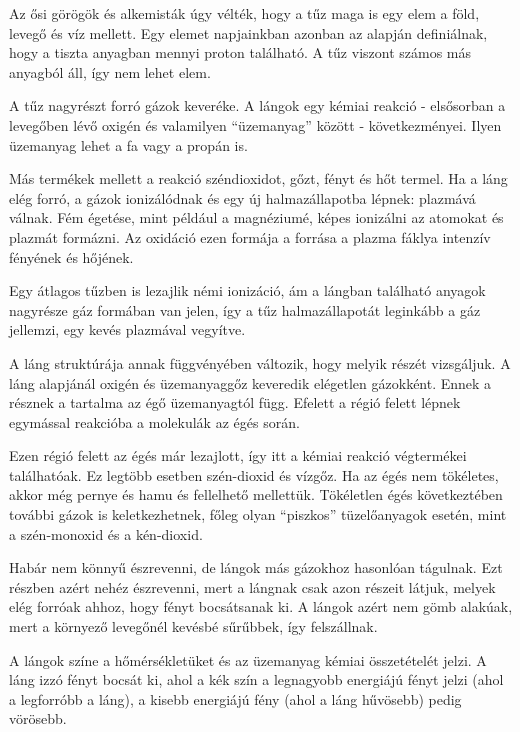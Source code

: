 
Az ősi görögök és alkemisták úgy vélték, hogy a tűz maga is egy elem a föld, levegő és víz mellett. Egy elemet napjainkban azonban az alapján definiálnak, hogy a tiszta anyagban mennyi proton található. A tűz viszont számos más anyagból áll, így nem lehet elem. 

A tűz nagyrészt forró gázok keveréke. A lángok egy kémiai reakció - elsősorban a levegőben lévő oxigén és valamilyen ``üzemanyag'' között - következményei. Ilyen üzemanyag lehet a fa vagy a propán is.

Más termékek mellett a reakció széndioxidot, gőzt, fényt és hőt termel. Ha a láng elég forró, a gázok ionizálódnak és egy új halmazállapotba lépnek: plazmává válnak. Fém égetése, mint például a magnéziumé, képes ionizálni az atomokat és plazmát formázni. Az oxidáció ezen formája a forrása a plazma fáklya intenzív fényének és hőjének.

Egy átlagos tűzben is lezajlik némi ionizáció, ám a lángban található anyagok nagyrésze gáz formában van jelen, így a tűz halmazállapotát leginkább a gáz jellemzi, egy kevés plazmával vegyítve.

A láng struktúrája annak függvényében változik, hogy melyik részét vizsgáljuk. A láng alapjánál oxigén és üzemanyaggőz keveredik elégetlen gázokként. Ennek a résznek a tartalma az égő üzemanyagtól függ. Efelett a régió felett lépnek egymással reakcióba a molekulák az égés során. 

Ezen régió felett az égés már lezajlott, így itt a kémiai reakció végtermékei találhatóak. Ez legtöbb esetben szén-dioxid és vízgőz. Ha az égés nem tökéletes, akkor még pernye és hamu és fellelhető mellettük. Tökéletlen égés következtében további gázok is keletkezhetnek, főleg olyan ``piszkos'' tüzelőanyagok esetén, mint a szén-monoxid és a kén-dioxid.

Habár nem könnyű észrevenni, de lángok más gázokhoz hasonlóan tágulnak. Ezt részben azért nehéz észrevenni, mert a lángnak csak azon részeit látjuk, melyek elég forróak ahhoz, hogy fényt bocsátsanak ki. A lángok azért nem gömb alakúak, mert a környező levegőnél kevésbé sűrűbbek, így felszállnak. 

A lángok színe a hőmérsékletüket és az üzemanyag kémiai összetételét jelzi. A láng izzó fényt bocsát ki, ahol a kék szín a legnagyobb energiájú fényt jelzi (ahol a legforróbb a láng), a kisebb energiájú fény (ahol a láng hűvösebb) pedig vörösebb.
\cite{firePhysics1, firePhysics2}

